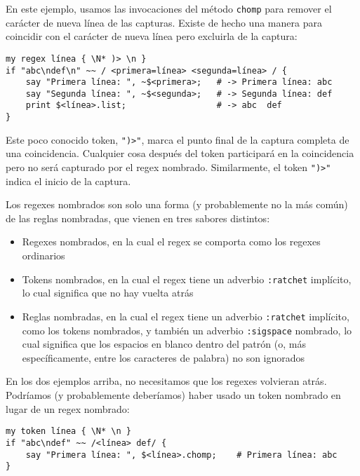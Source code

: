 En este ejemplo, usamos las invocaciones del método {\tt chomp}
para remover el carácter de nueva línea de las capturas. Existe
de hecho una manera para coincidir con el carácter de nueva línea
pero excluirla de la captura:

\begin{lstlisting}
my regex línea { \N* )> \n }
if "abc\ndef\n" ~~ / <primera=línea> <segunda=línea> / {
    say "Primera línea: ", ~$<primera>;   # -> Primera línea: abc
    say "Segunda línea: ", ~$<segunda>;   # -> Segunda línea: def
    print $<línea>.list;                  # -> abc  def
}
\end{lstlisting}

Este poco conocido token, \verb|")>"|, marca el punto final de
la captura completa de una coincidencia. Cualquier cosa después
del token participará en la coincidencia pero no será 
capturado por el regex nombrado. Similarmente, el token 
\verb|")>"| indica el inicio de la captura.

Los regexes nombrados son solo una forma (y probablemente no la
más común) de las reglas nombradas, que vienen en tres sabores
distintos:

\begin{itemize}
\item Regexes nombrados, en la cual el regex se comporta como
los regexes ordinarios
\item Tokens nombrados,  en la cual el regex tiene un adverbio
{\tt :ratchet} implícito, lo cual significa que no hay vuelta
atrás
\item Reglas nombradas, en la cual el regex tiene un adverbio
{\tt :ratchet} implícito, como los tokens nombrados, y también
un adverbio {\tt :sigspace} nombrado, lo cual significa que los
espacios en blanco dentro del patrón (o, más específicamente, entre
los caracteres de palabra) no son ignorados
\end{itemize}

En los dos ejemplos arriba, no necesitamos que los regexes
volvieran atrás. Podríamos (y probablemente deberíamos)
haber usado un token nombrado en lugar de un regex nombrado:

\begin{lstlisting}
my token línea { \N* \n }
if "abc\ndef" ~~ /<línea> def/ {
    say "Primera línea: ", $<línea>.chomp;    # Primera línea: abc
}
\end{lstlisting} 

